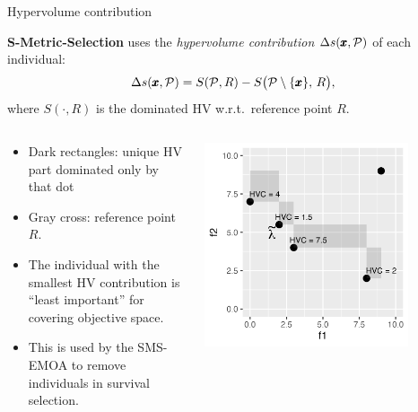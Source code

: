 \documentclass[11pt,compress,t,notes=noshow,xcolor=table]{beamer}
\newcommand{\xx}{\conf}     %
\begin{document}


\begin{vbframe}{Hypervolume contribution}

\textbf{S-Metric-Selection} uses the \emph{hypervolume contribution} $\Delta s(\xx,\mathcal{P})$ of each individual:
\[
  \Delta s(\xx, \mathcal{P})
  = S(\mathcal{P}, R) - S\bigl(\mathcal{P}\setminus\{\xx\},\,R\bigr),
\]
where $S(\cdot,R)$ is the dominated HV w.r.t.\ reference point $R$.

{\small
\begin{columns}
\begin{column}{0.5\textwidth}
\begin{itemize}
\item Dark rectangles: unique HV part dominated only by that dot
\item Gray cross: reference point $R$.
\item The individual with the smallest HV contribution is “least important” for covering objective space.
\item This is used by the SMS-EMOA to remove individuals in survival selection.
\end{itemize}
\end{column}
\begin{column}{0.5\textwidth}
\begin{center}
\includegraphics[width=0.8\textwidth]{slides/11-multicrit/figure_man/hv_contrib.png}
\end{center}
\end{column}
\end{columns}
}
\end{vbframe}
\end{document}
